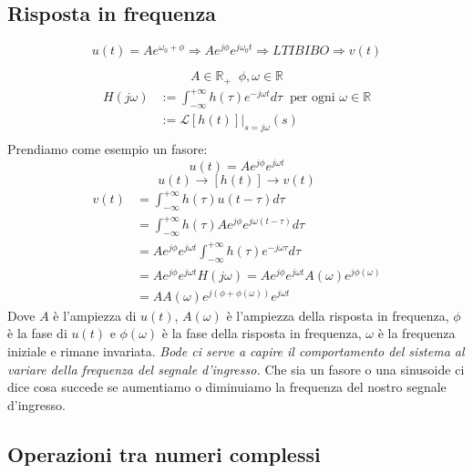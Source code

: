 \documentclass[a4paper]{article}
\begin{document}
\subsection{Risposta in frequenza}

\[u(t) = Ae^{\omega_0 + \phi} \Longrightarrow Ae^{j\phi}e^{j\omega_0t} \Longrightarrow LTI{BIBO} \Longrightarrow v(t)\]

\[A \in \mathbb{R}_+ \; \;\phi,\omega \in \mathbb{R}\]
\begin{align*}
    H(j\omega) &:= \int_{-\infty}^{+\infty} h(\tau)e^{-j\omega t}d\tau \; \; \text{per ogni } \omega \in \mathbb{R}\\
    &:= \mathcal{L}[h(t)]\bigg|_{s = j\omega}(s)\\
\end{align*}
\noindent
Prendiamo come esempio un fasore:
\[u(t) = Ae^{j\phi}e^{j\omega t}\] 
\[u(t) \rightarrow [h(t)] \rightarrow v(t)\]
\begin{align*}
    v(t) &= \int_{-\infty}^{+\infty} h(\tau)u(t-\tau)d\tau\\
    &= \int_{-\infty}^{+\infty} h(\tau)Ae^{j\phi}e^{j\omega(t-\tau)}d\tau\\
    &= Ae^{j\phi}e^{j\omega t}\int_{-\infty}^{+\infty} h(\tau)e^{-j\omega \tau}d\tau\\
    &= Ae^{j\phi}e^{j\omega t}H(j\omega) = Ae^{j\phi}e^{j\omega t}A(\omega)e^{j\phi(\omega)}\\
    &= AA(\omega)e^{j(\phi + \phi(\omega))}e^{j\omega t}
\end{align*}
Dove $A$ è l'ampiezza di $u(t)$, $A(\omega)$ è l'ampiezza della risposta in frequenza, $\phi$ è la fase di $u(t)$ e $\phi(\omega)$ è la fase della risposta in frequenza, $\omega$ è la frequenza iniziale e 
rimane invariata.
\textit{Bode ci serve a capire il comportamento del sistema al variare della frequenza del segnale d'ingresso.} Che sia un fasore o una sinusoide ci dice cosa succede se aumentiamo o diminuiamo la frequenza del nostro segnale d'ingresso.


\subsection{Operazioni tra numeri complessi}
\end{document}
